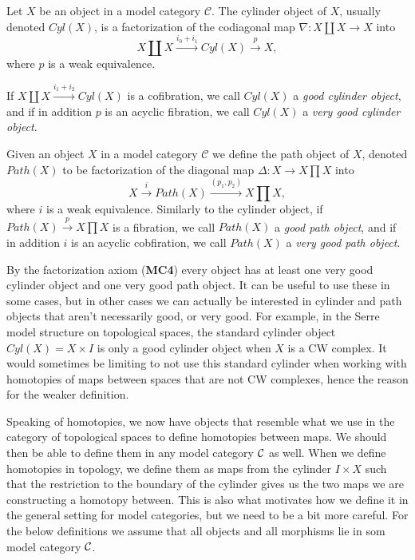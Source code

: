 \begin{definition}
\label{def:cylinder_object}
Let $X$ be an object in a model category $\mathcal{C}$. The cylinder object of $X$, usually denoted $Cyl(X)$, is a factorization of the codiagonal map $\nabla: X\coprod X\longrightarrow X$ into
\begin{equation*}
    X\coprod X\overset{i_0+i_1}\longrightarrow Cyl(X) \overset{p}\longrightarrow X,
\end{equation*} 
where $p$ is a weak equivalence. 

If $X\coprod X\overset{i_1 + i_2}\rightarrow Cyl(X)$ is a cofibration, we call $Cyl(X)$ a \emph{good cylinder object}, and if in addition $p$ is an acyclic fibration, we call $Cyl(X)$ a \emph{very good cylinder object}.
\end{definition}

\begin{definition}
\label{def:path_object}
Given an object $X$ in a model category $\mathcal{C}$ we define the path object of $X$, denoted $Path(X)$ to be factorization of the diagonal map $\Delta\colon X \rightarrow X\prod X$ into
\begin{equation*}
     X \overset{i}\rightarrow Path(X) \overset{(p_1,p_2)}\rightarrow X \prod X,
\end{equation*}
where $i$ is a weak equivalence. Similarly to the cylinder object, if $Path(X)\overset{p}\rightarrow X\prod X$ is a fibration, we call $Path(X)$ a \emph{good path object}, and if in addition $i$ is an acyclic cobfiration, we call $Path(X)$ a \emph{very good path object}.
\end{definition}

By the factorization axiom (\textbf{MC4}) every object has at least one very good cylinder object and one very good path object. It can be useful to use these in some cases, but in other cases we can actually be interested in cylinder and path objects that aren't necessarily good, or very good. For example, in the Serre model structure on topological spaces, the standard cylinder object $Cyl(X)=X\times I$ is only a good cylinder object when $X$ is a CW complex. It would sometimes be limiting to not use this standard cylinder when working with homotopies of maps between spaces that are not CW complexes, hence the reason for the weaker definition. 

Speaking of homotopies, we now have objects that resemble what we use in the category of topological spaces to define homotopies between maps. We should then be able to define them in any model category $\mathcal{C}$ as well. When we define homotopies in topology, we define them as maps from the cylinder $I\times X$ such that the restriction to the boundary of the cylinder gives us the two maps we are constructing a homotopy between. This is also what motivates how we define it in the general setting for model categories, but we need to be a bit more careful. For the below definitions we assume that all objects and all morphisms lie in som model category $\mathcal{C}$.

